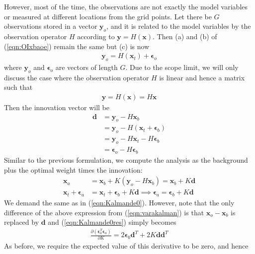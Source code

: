 However, most of the time, the observations are not exactly the model variables or measured at different locations from the grid points. Let there be $G$ observations stored in a vector $\textbf{y}_o$, and it is related to the model variables by the observation operator $H$ according to $\textbf{y} = H(\textbf{x})$. Then (a) and (b) of (\ref{eqn:OIxbaoe}) remain the same but (c) is now 
\begin{align}
\textbf{y}_o = H(\textbf{x}_t) + \bm{\epsilon}_o \label{eqn:OIinnover}
\end{align}
where $\textbf{y}_o$ and $ \bm{\epsilon}_o$ are vectors of length $G$. Due to the scope limit, we will only discuss the case where the observation operator $H$ is linear and hence a matrix such that
\begin{align}
\textbf{y} = H(\textbf{x}) = H\textbf{x}   
\end{align}
Then the innovation vector will be 
\begin{align}
\textbf{d} &= \textbf{y}_o - H\textbf{x}_b \nonumber \\
&= \textbf{y}_o - H(\textbf{x}_t + \bm{\epsilon}_b) \nonumber \\
&= \textbf{y}_o - H\textbf{x}_t - H\bm{\epsilon}_b \nonumber \\
&= \bm{\epsilon}_o -  H\bm{\epsilon}_b
\end{align}
Similar to the previous formulation, we compute the analysis as the background plus the optimal weight times the innovation:
\begin{align}
\textbf{x}_a &= \textbf{x}_b + K(\textbf{y}_o - H\textbf{x}_b) = \textbf{x}_b + K\textbf{d} \label{eqn:OIinnov1} \\
\textbf{x}_t + \bm{\epsilon}_a &= \textbf{x}_t + \bm{\epsilon}_b + K\textbf{d} \implies \bm{\epsilon}_a = \bm{\epsilon}_b + K\textbf{d} 
\end{align}
We demand the same as in (\ref{eqn:Kalmande0}). However, note that the only difference of the above expression from (\ref{eqn:varakalman}) is that $\textbf{x}_o - \textbf{x}_b$ is replaced by $\textbf{d}$ and (\ref{eqn:Kalmande0res}) simply becomes
\begin{align}
\frac{\partial (\bm{\epsilon}_a^T\bm{\epsilon}_a)}{\partial K} = 2\bm{\epsilon}_b\textbf{d}^T + 2K\textbf{d}\textbf{d}^T
\end{align}
As before, we require the expected value of this derivative to be zero, and hence

